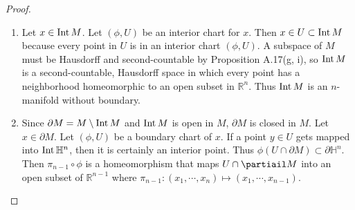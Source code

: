 \begin{proof}
  $ $
  \begin{enumerate}[label=(\alph*)]
    \item
      Let $x \in \operatorname{Int} M$.
      Let $(\phi, U)$ be an interior chart for $x$.
      Then $x \in U \subset \operatorname{Int} M$ because every point in $U$ is in an interior chart $(\phi, U)$.
      A subspace of $M$ must be Hausdorff and second-countable by Proposition A.17(g, i), so $\operatorname{Int} M$ is a second-countable, Hausdorff space in which every point has a neighborhood homeomorphic to an open subset in $\mathbb{R}^n$.
      Thus $\operatorname{Int} M$ is an $n$-manifold without boundary.
    \item
      Since $\partial M = M \setminus \operatorname{Int} M$ and $\operatorname{Int} M$ is open in $M$, $\partial M$ is closed in $M$.
      Let $x \in \partial M$.
      Let $(\phi, U)$ be a boundary chart of $x$.
      If a point $y \in U$ gets mapped into $\operatorname{Int} \mathbb{H}^n$, then it is certainly an interior point.
      Thus $\phi(U \cap \partial M) \subset \partial \mathbb{H}^n$.
      Then $\pi_{n - 1} \circ \phi$ is a homeomorphism that maps $U \cap \partiail M$ into an open subset of $\mathbb{R}^{n - 1}$ where $\pi_{n - 1}: (x_1, \cdots, x_n) \mapsto (x_1, \cdots, x_{n - 1 })$.
  \end{enumerate}
\end{proof}
